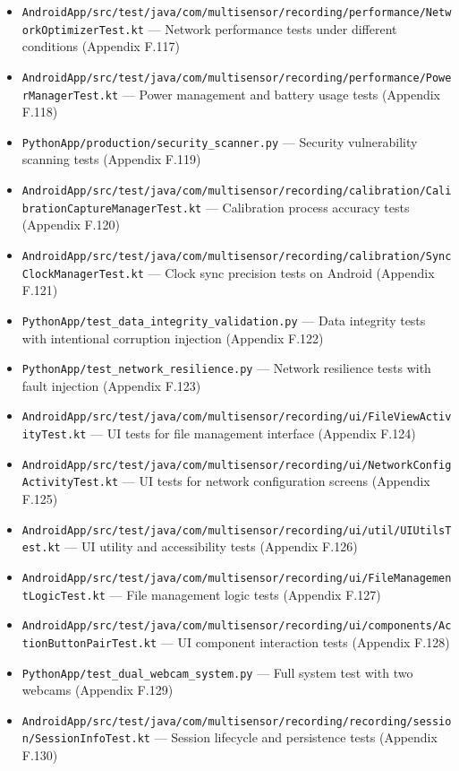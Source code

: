 {{\begin{itemize}
\item \texttt{AndroidApp/src/test/java/com/multisensor/recording/performance/NetworkOptimizerTest.kt}
  --- Network performance tests under different conditions (Appendix
  F.117)
\item \texttt{AndroidApp/src/test/java/com/multisensor/recording/performance/PowerManagerTest.kt}
  --- Power management and battery usage tests (Appendix F.118)
\item \texttt{PythonApp/production/security_scanner.py} --- Security vulnerability
  scanning tests (Appendix F.119)
\item \texttt{AndroidApp/src/test/java/com/multisensor/recording/calibration/CalibrationCaptureManagerTest.kt}
  --- Calibration process accuracy tests (Appendix F.120)
\item \texttt{AndroidApp/src/test/java/com/multisensor/recording/calibration/SyncClockManagerTest.kt}
  --- Clock sync precision tests on Android (Appendix F.121)
\item \texttt{PythonApp/test_data_integrity_validation.py} --- Data integrity tests
  with intentional corruption injection (Appendix F.122)
\item \texttt{PythonApp/test_network_resilience.py} --- Network resilience tests
  with fault injection (Appendix F.123)
\item \texttt{AndroidApp/src/test/java/com/multisensor/recording/ui/FileViewActivityTest.kt}
  --- UI tests for file management interface (Appendix F.124)
\item \texttt{AndroidApp/src/test/java/com/multisensor/recording/ui/NetworkConfigActivityTest.kt}
  --- UI tests for network configuration screens (Appendix F.125)
\item \texttt{AndroidApp/src/test/java/com/multisensor/recording/ui/util/UIUtilsTest.kt}
  --- UI utility and accessibility tests (Appendix F.126)
\item \texttt{AndroidApp/src/test/java/com/multisensor/recording/ui/FileManagementLogicTest.kt}
  --- File management logic tests (Appendix F.127)
\item \texttt{AndroidApp/src/test/java/com/multisensor/recording/ui/components/ActionButtonPairTest.kt}
  --- UI component interaction tests (Appendix F.128)
\item \texttt{PythonApp/test_dual_webcam_system.py} --- Full system test with two
  webcams (Appendix F.129)
\item \texttt{AndroidApp/src/test/java/com/multisensor/recording/recording/session/SessionInfoTest.kt}
  --- Session lifecycle and persistence tests (Appendix F.130)

\end{itemize}}}
